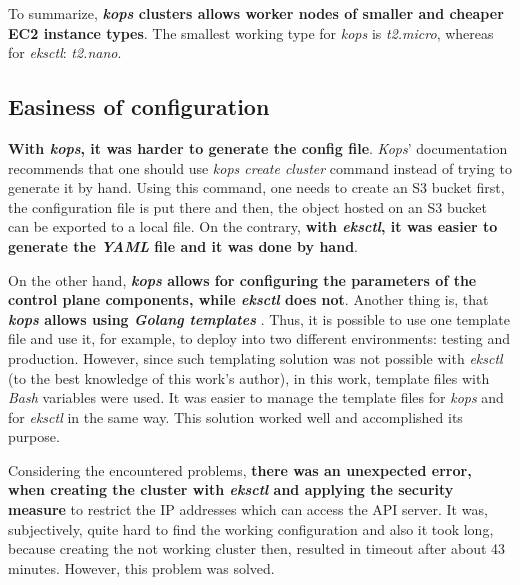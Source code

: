 To summarize, \textbf{\textit{kops} clusters allows worker nodes of smaller and cheaper EC2 instance types}. The smallest working type for \textit{kops} is \textit{t2.micro}, whereas for \textit{eksctl}: \textit{t2.nano}.

\subsection{Easiness of configuration}

\textbf{With \textit{kops}, it was harder to generate the config file}. \textit{Kops}' documentation recommends that one should use \textit{kops create cluster} command instead of trying to generate it by hand. Using this command, one needs to create an S3 bucket first, the configuration file is put there and then, the object hosted on an S3 bucket can be exported to a local file. On the contrary, \textbf{with \textit{eksctl}, it was easier to generate the \textit{YAML} file and it was done by hand}.

On the other hand, \textbf{\textit{kops} allows for configuring the parameters of the control plane components, while \textit{eksctl} does not}. Another thing is, that \textbf{\textit{kops} allows using \textit{Golang templates}} \cite{online-kops-yaml-config-golang}. Thus, it is possible to use one template file and use it, for example, to deploy into two different environments: testing and production. However, since such templating solution was not possible with \textit{eksctl} (to the best knowledge of this work's author), in this work, template files with \textit{Bash} variables were used. It was easier to manage the template files for \textit{kops} and for \textit{eksctl} in the same way. This solution worked well and accomplished its purpose.

Considering the encountered problems, \textbf{there was an unexpected error, when creating the cluster with \textit{eksctl} and applying the security measure} to restrict the IP addresses which can access the API server. It was, subjectively, quite hard to find the working configuration and also it took long, because creating the not working cluster then, resulted in timeout after about 43 minutes. However, this problem was solved.


